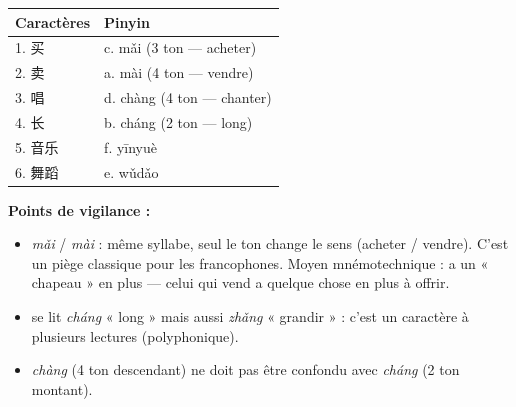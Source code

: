 \documentclass[11pt]{article}
\newcommand{\zh}[1]{\ifmmode\text{#1}\else{#1}\fi}
\begin{document}
\begin{corrige}
\begin{center}
\begin{tabularx}{\linewidth}{|X|X|}
\hline
\rowcolor{popblueL} Caractères & Pinyin \\
\hline
1. 买 & c. mǎi (3\ieme{} ton — acheter) \\
\hline
2. 卖 & a. mài (4\ieme{} ton — vendre) \\
\hline
3. 唱 & d. chàng (4\ieme{} ton — chanter) \\
\hline
4. 长 & b. cháng (2\ieme{} ton — long) \\
\hline
5. 音乐 & f. yīnyuè \\
\hline
6. 舞蹈 & e. wǔdǎo \\
\hline
\end{tabularx}
\end{center}

\textbf{Points de vigilance :}
\begin{itemize}
\item \zh{买} \emph{mǎi} / \zh{卖} \emph{mài} : même syllabe, seul le ton change le sens (acheter / vendre). C'est un piège classique pour les francophones. Moyen mnémotechnique : \zh{卖} a un « chapeau » \zh{十} en plus — celui qui vend a quelque chose en plus à offrir.
\item \zh{长} se lit \emph{cháng} « long » mais aussi \emph{zhǎng} « grandir » : c'est un caractère à plusieurs lectures (polyphonique).
\item \zh{唱} \emph{chàng} (4\ieme{} ton descendant) ne doit pas être confondu avec \zh{长} \emph{cháng} (2\ieme{} ton montant).
\end{itemize}
\end{corrige}
\end{document}
